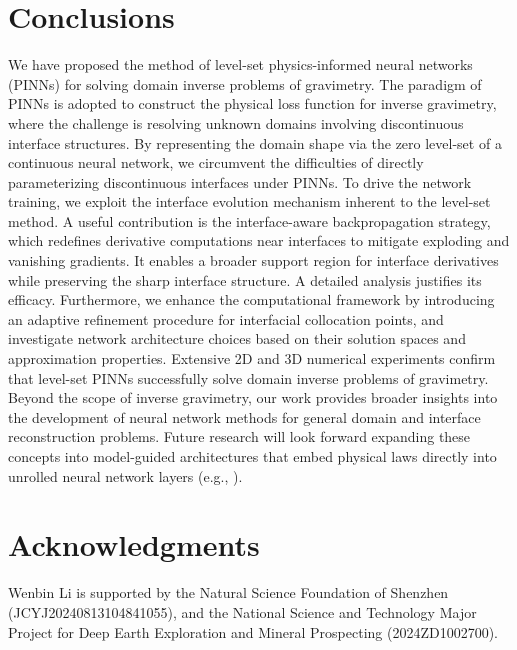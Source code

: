 \documentclass[final,hidelinks,onefignum,onetabnum]{siamart251216}
\begin{document}

\section{Conclusions} \label{sec5}
We have proposed the method of level-set physics-informed neural networks (PINNs) for solving domain inverse problems of gravimetry. 
The paradigm of PINNs is adopted to construct the physical loss function for inverse gravimetry, where the challenge is resolving unknown domains involving discontinuous interface structures. By representing the domain shape via the zero level-set of a continuous neural network, we circumvent the difficulties of directly parameterizing discontinuous interfaces under PINNs. To drive the network training, we exploit the interface evolution mechanism inherent to the level-set method. A useful contribution is the interface-aware backpropagation strategy, which redefines derivative computations near interfaces to mitigate exploding and vanishing gradients. It enables a broader support region for interface derivatives while preserving the sharp interface structure. A detailed analysis justifies its efficacy. Furthermore, we enhance the computational framework by introducing an adaptive refinement procedure for interfacial collocation points, and investigate network architecture choices based on their solution spaces and approximation properties. Extensive 2D and 3D numerical experiments confirm that level-set PINNs successfully solve domain inverse problems of gravimetry.
Beyond the scope of inverse gravimetry, our work provides broader insights into the development of neural network methods for general domain and interface reconstruction problems. Future research will look forward expanding these concepts into model-guided architectures that embed physical laws directly into unrolled neural network layers (e.g., \cite{tsameletc25}).

\section*{Acknowledgments}
Wenbin Li is supported by the Natural Science Foundation of Shenzhen (JCYJ20240813104841055), and the National Science and Technology Major Project for Deep Earth Exploration and Mineral Prospecting (2024ZD1002700). 




\end{document}
